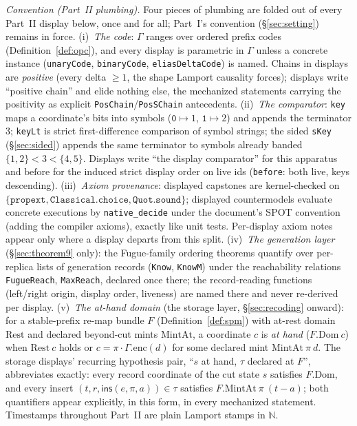 \documentclass[11pt]{article}
\newcommand{\lean}[1]{\texttt{#1}}
\newcommand{\code}[1]{\texttt{#1}}
\newcommand{\ins}{\mathsf{ins}}
\begin{document}
\emph{Convention (Part~II plumbing).} Four pieces of plumbing are
folded out of every Part~II display below, once and for all; Part~I's
convention (\S\ref{sec:setting}) remains in force. (i)~\emph{The
code}: $\Gamma$ ranges over ordered prefix codes
(Definition~\ref{def:opc}), and every display is parametric in
$\Gamma$ unless a concrete instance (\lean{unaryCode},
\lean{binaryCode}, \lean{eliasDeltaCode}) is named. Chains in
displays are \emph{positive} (every delta $\ge 1$, the shape Lamport
causality forces); displays write ``positive chain'' and elide
nothing else, the mechanized statements carrying the positivity as
explicit \lean{PosChain}/\lean{PosSChain} antecedents.
(ii)~\emph{The comparator}: \lean{key} maps a coordinate's bits into
symbols ($\code{0} \mapsto 1$, $\code{1} \mapsto 2$) and appends the
terminator $3$; \lean{keyLt} is strict first-difference comparison of
symbol strings; the sided \lean{sKey} (\S\ref{sec:sided}) appends the
same terminator to symbols already banded $\{1,2\} < 3 < \{4,5\}$.
Displays write ``the display comparator'' for this apparatus and
$\mathrm{before}$ for the induced strict display order on live ids
(\lean{before}: both live, keys descending). (iii)~\emph{Axiom
provenance}: displayed capstones are kernel-checked on
$\{\lean{propext}, \lean{Classical.choice}, \lean{Quot.sound}\}$;
displayed countermodels evaluate concrete executions by
\lean{native\_decide} under the document's SPOT convention (adding
the compiler axioms), exactly like unit tests. Per-display axiom
notes appear only where a display departs from this split.
(iv)~\emph{The generation layer} (\S\ref{sec:theorem9} only): the
Fugue-family ordering theorems quantify over per-replica lists of
generation records (\lean{Know}, \lean{KnowM}) under the reachability
relations \lean{FugueReach}, \lean{MaxReach}, declared once there;
the record-reading functions (left/right origin, display order,
liveness) are named there and never re-derived per display.
(v)~\emph{The at-hand domain} (the storage layer, \S\ref{sec:recoding}
onward): for a stable-prefix re-map bundle $F$
(Definition~\ref{def:spm}) with at-rest domain $\mathrm{Rest}$ and
declared beyond-cut mints $\mathrm{MintAt}$, a coordinate $c$ is
\emph{at hand} ($F.\mathrm{Dom}\ c$) when $\mathrm{Rest}\ c$ holds or
$c = \pi \cdot \Gamma.\mathrm{enc}(d)$ for some declared mint
$\mathrm{MintAt}\ \pi\ d$. The storage displays' recurring hypothesis
pair, ``$s$ at hand, $\tau$ declared at $F$'', abbreviates exactly:
every record coordinate of the cut state $s$ satisfies
$F.\mathrm{Dom}$, and every insert $(t, r, \ins(e, \pi, a)) \in \tau$
satisfies $F.\mathrm{MintAt}\ \pi\ (t - a)$; both quantifiers appear
explicitly, in this form, in every mechanized statement.
Timestamps throughout Part~II are plain Lamport stamps in
$\mathbb{N}$.
\end{document}
